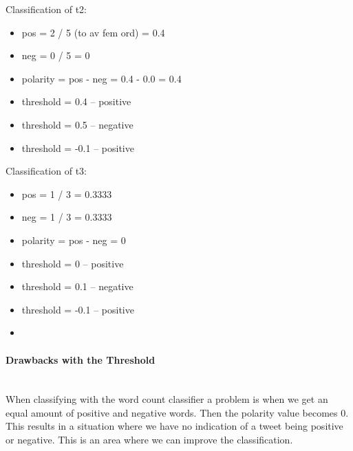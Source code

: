 Classification of t2:
\begin{itemize}
    \item pos = 2 / 5 (to av fem ord) = 0.4
    \item neg = 0 / 5 = 0
    \item polarity = pos - neg = 0.4 - 0.0 = 0.4
    \item threshold = 0.4 -- positive
    \item threshold = 0.5 -- negative 
    \item threshold = -0.1 -- positive
\end{itemize}

Classification of t3:
\begin{itemize}
    \item pos = 1 / 3 = 0.3333
    \item neg = 1 / 3 = 0.3333
    \item polarity = pos - neg = 0
    \item threshold = 0 -- positive
    \item threshold = 0.1 -- negative
    \item threshold = -0.1 -- positive
	\item 
\end{itemize}

\paragraph{Drawbacks with the Threshold}
\hspace{0pt}\\
When classifying with the word count classifier a problem is when we
get an equal amount of positive and negative words. Then the polarity value
becomes 0. This results in a situation where we have no indication of a tweet
being positive or negative. This is an area where we can improve the
classification. 


